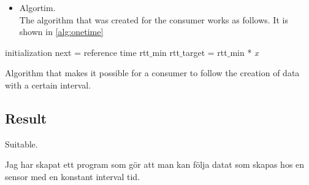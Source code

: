 \begin{itemize}
\item Algortim. \\
The algorithm that was created for the consumer works as follows. 
It is shown in \ref{alg:onetime}


\end{itemize}


\begin{algorithm}[H]
 initialization\;
 next = reference time\;
 rtt$\_$min\;
 rtt$\_$target = rtt$\_$min * \textit{x}\;
 \caption{Algorithm that makes it possible for a consumer to follow the creation of data with a certain interval.}
 \label{alg:onetime}
\end{algorithm}


\subsection{Result}
Suitable.




Jag har skapat ett program som gör att man kan följa datat som skapas hos en sensor med en konstant interval tid. 
